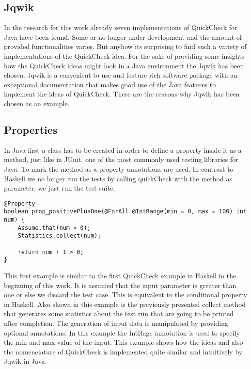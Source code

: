\documentclass[a4paper, 12pt]{article} %
\begin{document}
\subsection{Jqwik}

In the research for this work already seven implementations of QuickCheck for Java have been found. Some ar no longer under development and the amount of provided functionalities varies. But anyhow its surprising to find such a variety of implementations of the QuickCheck idea. For the sake of providing some insights how the QuickCheck ideas might look in a Java environment the Jqwik \cite{jqwik} has been chosen. Jqwik is a convenient to use and feature rich software package with an exceptional documentation that makes good use of the Java features to implement the ideas of QuickCheck. These are the reasons why Jqwik has been chosen as an example.

\subsection{Properties}

In Java first a class has to be created in order to define a property inside it as a method, just like in JUnit, one of the most commonly used testing libraries for Java. To mark the method as a property annotations are used. In contrast to Haskell we no longer run the tests by calling quickCheck with the method as parameter, we just run the test suite. 

\begin{verbatim}
@Property
boolean prop_positivePlusOne(@ForAll @IntRange(min = 0, max = 100) int num) {
    Assume.that(num > 0);
    Statistics.collect(num);
    
    return num + 1 > 0;
}
\end{verbatim}

This first example is similar to the first QuickCheck example in Haskell in the beginning of this work. It is assumed that the input parameter is greater than one or else we discard the test case. This is equivalent to the conditional property in Haskell. Also shown in this example is the previously presented collect method that generates some statistics about the test run that are going to be printed after completion. The generation of input data is manipulated by providing optional annotations. In this example the IntRage annotation is used to specify the min and max value of the input. This example shows how the ideas and also the nomenclature of QuickCheck is implemented quite similar and intuitively by Jqwik in Java.
\end{document}
